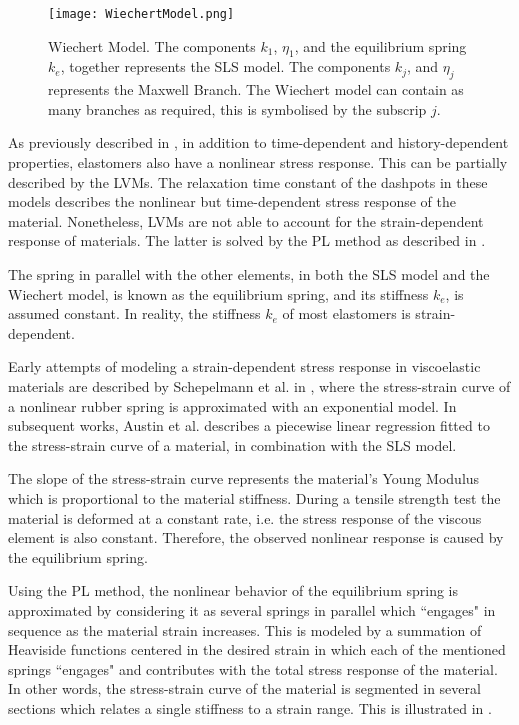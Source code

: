 \begin{figure}[hbt!]
	\centering
    \texttt{[image: WiechertModel.png]}
    \caption{Wiechert Model. The components $k_1$, $\eta_1$, and the equilibrium spring $k_e$, together represents the SLS model. The components $k_j$, and $\eta_j$ represents the Maxwell Branch. The Wiechert model can contain as many branches as required, this is symbolised by the subscrip $j$. }
    \label{fig:wiechert}
\end{figure}

As previously described in , in addition to time-dependent and history-dependent properties, elastomers also have a nonlinear stress response. This can be partially described by the LVMs. The relaxation time constant of the dashpots in these models describes the nonlinear but time-dependent stress response of the material. Nonetheless, LVMs are not able to account for the strain-dependent response of materials. The latter is solved by the PL method as described in \cite{austin2015control}.

The spring in parallel with the other elements, in both the SLS model and the Wiechert model, is known as the equilibrium spring, and its stiffness $k_e$, is assumed constant. In reality, the stiffness $k_e$ of most elastomers is strain-dependent. 

Early attempts of modeling a strain-dependent stress response in viscoelastic materials are described by Schepelmann et al. in \cite{schepelmann2014compact}, where the stress-strain curve of a nonlinear rubber spring is approximated with an exponential model. In subsequent works, Austin et al. describes a piecewise linear regression fitted to the stress-strain curve of a material, in combination with the SLS model. 

The slope of the stress-strain curve represents the material's Young Modulus which is proportional to the material stiffness. During a tensile strength test the material is deformed at a constant rate, i.e. the stress response of the viscous element is also constant. Therefore, the observed nonlinear response is caused by the equilibrium spring.

Using the PL method, the nonlinear behavior of the equilibrium spring is approximated by considering it as several springs in parallel which ``engages" in sequence as the material strain increases. This is modeled by a summation of Heaviside functions centered in the desired strain in which each of the mentioned springs ``engages" and contributes with the total stress response of the material. In other words, the stress-strain curve of the material is segmented in several sections which relates a single stiffness to a strain range. This is illustrated in .

